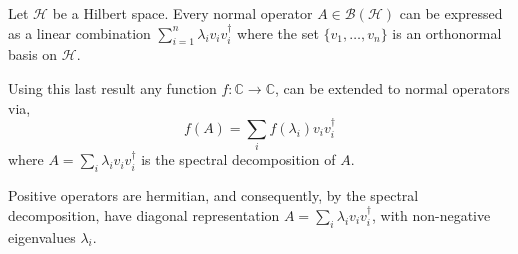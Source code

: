 \begin{theorem}  \cite[Corollary 1.4]{watrous2018theory}
  Let $\mathcal{H}$ be a Hilbert space. Every normal operator $A \in \mathcal{B}(\mathcal{H})$ can be expressed as a linear combination $\sum_{i=1}^n \lambda_{i}v_{i}v_{i}^{\dag}$ where the set $\{v_{1}, \ldots , v_{n}\}$ is an orthonormal basis on $\mathcal{H}$.
\end{theorem}

Using this last result any function $f:\mathbb{C} \xrightarrow{} \mathbb{C}$, can be extended to normal operators via,
  \begin{equation} \label{eq:apply_f_diag} 
    f(A) = \sum_{i} f(\lambda_{i})v_{i}v_{i}^{\dag}
\end {equation}
where $A = \sum_{i} \lambda_{i}v_{i}v_{i}^{\dag}$ is the spectral decomposition of $A$.


Positive operators are hermitian, and consequently, by the spectral decomposition, have diagonal representation $A =  \sum_i \lambda_i v_i v_i^{\dag}$, with non-negative eigenvalues $\lambda_i$.

